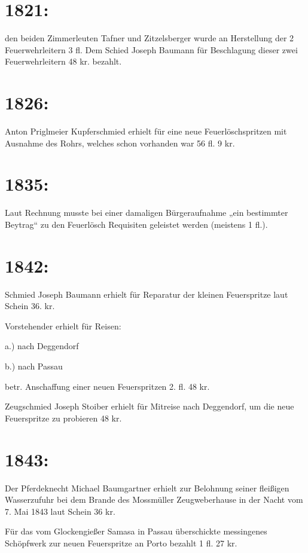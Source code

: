 \documentclass[12pt,a4paper]{book}
\begin{document}
\section{1821:}

den beiden Zimmerleuten Tafner und Zitzelsberger wurde an Herstellung der 2
Feuerwehrleitern 3 fl. Dem Schied Joseph Baumann für Beschlagung dieser zwei
Feuerwehrleitern 48 kr. bezahlt.

\section{1826:}

Anton Priglmeier Kupferschmied erhielt für eine neue Feuerlöschspritzen mit
Ausnahme des Rohrs, welches schon vorhanden war 56 fl. 9 kr.

\section{1835:}

Laut Rechnung musste bei einer damaligen Bürgeraufnahme „ein bestimmter Beytrag“
zu den Feuerlösch Requisiten geleistet werden (meistens 1 fl.).

\section{1842:}

Schmied Joseph Baumann erhielt für Reparatur der kleinen Feuerspritze laut
Schein 36. kr.

Vorstehender erhielt für Reisen:

a.) nach Deggendorf

b.) nach Passau

betr. Anschaffung einer neuen Feuerspritzen 2. fl. 48 kr.

Zeugschmied Joseph Stoiber erhielt für Mitreise nach Deggendorf, um die neue
Feuerspritze zu probieren 48 kr.

\section{1843:}

Der Pferdeknecht Michael Baumgartner erhielt zur Belohnung seiner fleißigen
Wasserzufuhr bei dem Brande des Mossmüller Zeugweberhause in der Nacht vom 7.
Mai 1843 laut Schein 36 kr.

Für das vom Glockengießer Samasa in Passau überschickte messingenes Schöpfwerk
zur neuen Feuerspritze an Porto bezahlt 1 fl. 27 kr.
\end{document}
